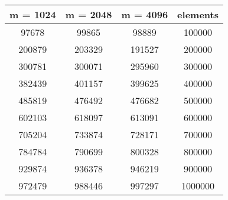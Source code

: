 \begin{tabular}{cccc}
m = 1024 & m = 2048 & m = 4096 & elements\\\hline
97678 & 99865 & 98889 & 100000\\
200879 & 203329 & 191527 & 200000\\
300781 & 300071 & 295960 & 300000\\
382439 & 401157 & 399625 & 400000\\
485819 & 476492 & 476682 & 500000\\
602103 & 618097 & 613091 & 600000\\
705204 & 733874 & 728171 & 700000\\
784784 & 790699 & 800328 & 800000\\
929874 & 936378 & 946219 & 900000\\
972479 & 988446 & 997297 & 1000000\\
\end{tabular}
